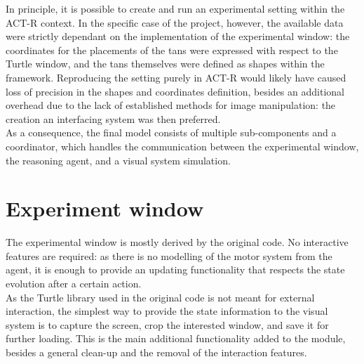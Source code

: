 \documentclass[a4paper,singleside,12pt]{report} %
\begin{document}
    In principle, it is possible to create and run an experimental setting within the ACT-R context. In the specific case of the project, however, the available data were strictly dependant on the implementation of the experimental window: the coordinates for the placements of the tans were expressed with respect to the Turtle window, and the tans themselves were defined as shapes within the framework. Reproducing the setting purely in ACT-R would likely have caused loss of precision in the shapes and coordinates definition, besides an additional overhead due to the lack of established methods for image manipulation: the creation an interfacing system was then preferred.\\
    As a consequence, the final model consists of multiple sub-components and a coordinator, which handles the communication between the experimental window, the reasoning agent, and a visual system simulation.\\
    
    \section{Experiment window}
    The experimental window is mostly derived by the original code. No interactive features are required: as there is no modelling of the motor system from the agent, it is enough to provide an updating functionality that respects the state evolution after a certain action.\\
    As the Turtle library used in the original code is not meant for external interaction, the simplest way to provide the state information to the visual system is to capture the screen, crop the interested window, and save it for further loading. This is the main additional functionality added to the module, besides a general clean-up and the removal of the interaction features.
\end{document}
